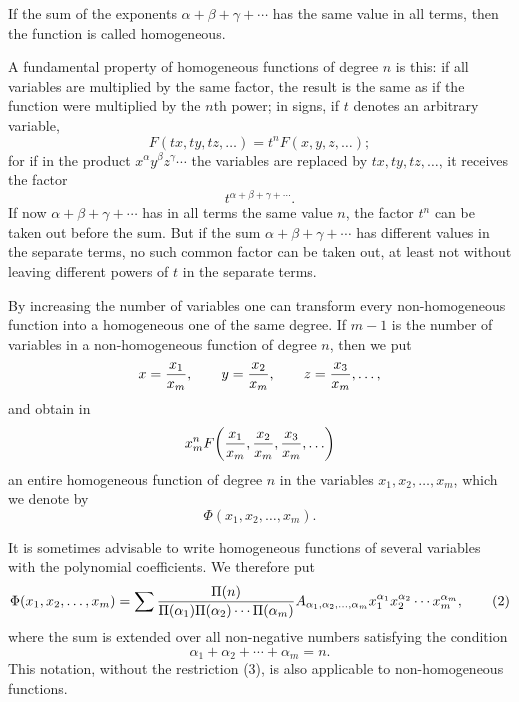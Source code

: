 \documentclass[11pt]{article}
\begin{document}
If the sum of the exponents $\alpha+\beta+\gamma+\cdots$ has the same value in all terms, then the function is called homogeneous.

A fundamental property of homogeneous functions of degree $n$ is this: if all variables are multiplied by the same factor, the result is the same as if the function were multiplied by the $n$th power; in signs, if $t$ denotes an arbitrary variable,
\begin{equation}
 F(tx,ty,tz,\ldots)=t^nF(x,y,z,\ldots);
\tag{1}
\end{equation}
for if in the product $x^\alpha y^\beta z^\gamma\cdots$ the variables are replaced by $tx,ty,tz,\ldots$, it receives the factor
\[
 t^{\alpha+\beta+\gamma+\cdots}.
\]
If now $\alpha+\beta+\gamma+\cdots$ has in all terms the same value $n$, the factor $t^n$ can be taken out before the sum. But if the sum $\alpha+\beta+\gamma+\cdots$ has different values in the separate terms, no such common factor can be taken out, at least not without leaving different powers of $t$ in the separate terms.

By increasing the number of variables one can transform every non-homogeneous function into a homogeneous one of the same degree. If $m-1$ is the number of variables in a non-homogeneous function of degree $n$, then we put
\[
 x={x_1\over x_m},\qquad y={x_2\over x_m},\qquad z={x_3\over x_m},\ldots,
\]
and obtain in
\[
 x_m^n F\!\left({x_1\over x_m},{x_2\over x_m},{x_3\over x_m},\ldots\right)
\]
an entire homogeneous function of degree $n$ in the variables $x_1,x_2,\ldots,x_m$, which we denote by
\[
 \Phi(x_1,x_2,\ldots,x_m).
\]

It is sometimes advisable to write homogeneous functions of several variables with the polynomial coefficients. We therefore put
\begin{equation}
 \Phi(x_1,x_2,\ldots,x_m)=
 \sum{\Pi(n)\over\Pi(\alpha_1)\Pi(\alpha_2)\cdots\Pi(\alpha_m)}
 A_{\alpha_1,\alpha_2,\ldots,\alpha_m}
 x_1^{\alpha_1}x_2^{\alpha_2}\cdots x_m^{\alpha_m},
\tag{2}
\end{equation}
where the sum is extended over all non-negative numbers satisfying the condition
\begin{equation}
 \alpha_1+\alpha_2+\cdots+\alpha_m=n.
\tag{3}
\end{equation}
This notation, without the restriction (3), is also applicable to non-homogeneous functions.
\end{document}
